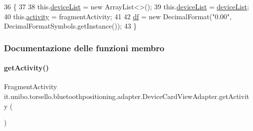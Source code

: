 \begin{DoxyCode}
36                                                                                                    \{
37 
38         this.\hyperlink{classit_1_1unibo_1_1torsello_1_1bluetoothpositioning_1_1adapter_1_1DeviceCardViewAdapter_a72413f87c723c585bd1ad9bc5711cf39_a72413f87c723c585bd1ad9bc5711cf39}{deviceList} = \textcolor{keyword}{new} ArrayList<>();
39         this.\hyperlink{classit_1_1unibo_1_1torsello_1_1bluetoothpositioning_1_1adapter_1_1DeviceCardViewAdapter_a72413f87c723c585bd1ad9bc5711cf39_a72413f87c723c585bd1ad9bc5711cf39}{deviceList} = \hyperlink{classit_1_1unibo_1_1torsello_1_1bluetoothpositioning_1_1adapter_1_1DeviceCardViewAdapter_a72413f87c723c585bd1ad9bc5711cf39_a72413f87c723c585bd1ad9bc5711cf39}{deviceList};
40         this.\hyperlink{classit_1_1unibo_1_1torsello_1_1bluetoothpositioning_1_1adapter_1_1DeviceCardViewAdapter_ad9b0572ad094da8225f1c2024ac2eb61_ad9b0572ad094da8225f1c2024ac2eb61}{activity} = fragmentActivity;
41 
42         \hyperlink{classit_1_1unibo_1_1torsello_1_1bluetoothpositioning_1_1adapter_1_1DeviceCardViewAdapter_ae3a2fe6b4e69e1f9b8edfb9bcba14057_ae3a2fe6b4e69e1f9b8edfb9bcba14057}{df} = \textcolor{keyword}{new} DecimalFormat(\textcolor{stringliteral}{"0.00"}, DecimalFormatSymbols.getInstance());
43     \}
\end{DoxyCode}


\subsubsection{Documentazione delle funzioni membro}
\hypertarget{classit_1_1unibo_1_1torsello_1_1bluetoothpositioning_1_1adapter_1_1DeviceCardViewAdapter_a0ff32c6bf5d84b68021bf586d64cacaf_a0ff32c6bf5d84b68021bf586d64cacaf}{}\label{classit_1_1unibo_1_1torsello_1_1bluetoothpositioning_1_1adapter_1_1DeviceCardViewAdapter_a0ff32c6bf5d84b68021bf586d64cacaf_a0ff32c6bf5d84b68021bf586d64cacaf} 
\paragraph{\texorpdfstring{get\+Activity()}{getActivity()}}
{\footnotesize\ttfamily Fragment\+Activity it.\+unibo.\+torsello.\+bluetoothpositioning.\+adapter.\+Device\+Card\+View\+Adapter.\+get\+Activity (\begin{DoxyParamCaption}{ }\end{DoxyParamCaption})\hspace{0.3cm}{\ttfamily [private]}}


